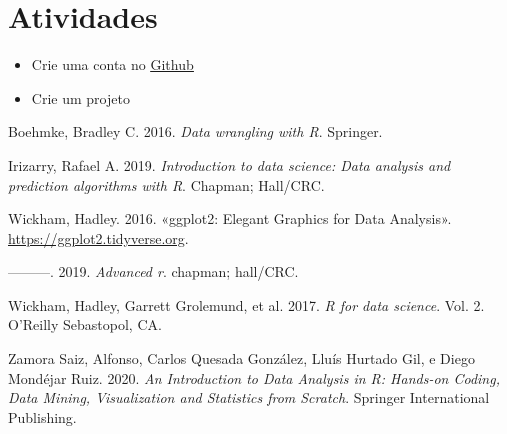 \documentclass[
  letterpaper,
  DIV=11,
  numbers=noendperiod]{scrartcl}
\newlength{\cslhangindent}
\newenvironment{CSLReferences}[2] %
 {\begin{list}{}{%
  \setlength{\itemindent}{0pt}
  \setlength{\leftmargin}{0pt}
  \setlength{\parsep}{0pt}
  \ifodd #1
   \setlength{\leftmargin}{\cslhangindent}
   \setlength{\itemindent}{-1\cslhangindent}
  \fi
  \setlength{\itemsep}{#2\baselineskip}}}
 {\end{list}}
\begin{document}
\section{Atividades}\label{atividades}

\begin{itemize}
\item
  Crie uma conta no \href{https://github.com/}{\ul{Github}}
\item
  Crie um projeto
\end{itemize}

\label{refs}
\begin{CSLReferences}{1}{0}
Boehmke, Bradley C. 2016. \emph{Data wrangling with R}. Springer.

Irizarry, Rafael A. 2019. \emph{Introduction to data science: Data
analysis and prediction algorithms with R}. Chapman; Hall/CRC.

Wickham, Hadley. 2016. {«ggplot2: Elegant Graphics for Data Analysis»}.
\url{https://ggplot2.tidyverse.org}.

---------. 2019. \emph{Advanced r}. chapman; hall/CRC.

Wickham, Hadley, Garrett Grolemund, et al. 2017. \emph{R for data
science}. Vol. 2. O'Reilly Sebastopol, CA.

Zamora Saiz, Alfonso, Carlos Quesada González, Lluís Hurtado Gil, e
Diego Mondéjar Ruiz. 2020. \emph{An Introduction to Data Analysis in R:
Hands-on Coding, Data Mining, Visualization and Statistics from
Scratch}. Springer International Publishing.

\end{CSLReferences}
\end{document}

